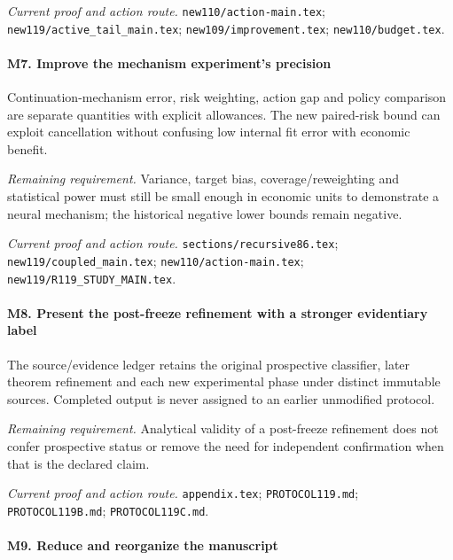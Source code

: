 \par\emph{Current proof and action route.} \nolinkurl{new110/action-main.tex}; \nolinkurl{new119/active_tail_main.tex}; \nolinkurl{new109/improvement.tex}; \nolinkurl{new110/budget.tex}.

\paragraph{M7. Improve the mechanism experiment's precision}

Continuation-mechanism error, risk weighting, action gap and policy comparison are separate quantities with explicit allowances. The new paired-risk bound can exploit cancellation without confusing low internal fit error with economic benefit.

\par\emph{Remaining requirement.} Variance, target bias, coverage/\allowbreak{}reweighting and statistical power must still be small enough in economic units to demonstrate a neural mechanism; the historical negative lower bounds remain negative.

\par\emph{Current proof and action route.} \nolinkurl{sections/recursive86.tex}; \nolinkurl{new119/coupled_main.tex}; \nolinkurl{new110/action-main.tex}; \nolinkurl{new119/R119_STUDY_MAIN.tex}.

\paragraph{M8. Present the post-freeze refinement with a stronger evidentiary label}

The source/\allowbreak{}evidence ledger retains the original prospective classifier, later theorem refinement and each new experimental phase under distinct immutable sources. Completed output is never assigned to an earlier unmodified protocol.

\par\emph{Remaining requirement.} Analytical validity of a post-freeze refinement does not confer prospective status or remove the need for independent confirmation when that is the declared claim.

\par\emph{Current proof and action route.} \nolinkurl{appendix.tex}; \nolinkurl{PROTOCOL119.md}; \nolinkurl{PROTOCOL119B.md}; \nolinkurl{PROTOCOL119C.md}.

\paragraph{M9. Reduce and reorganize the manuscript}

